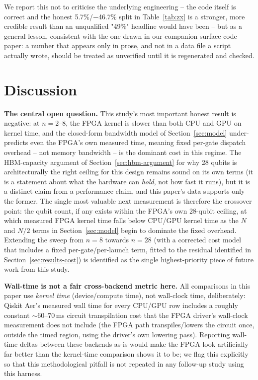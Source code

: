 \documentclass[pdflatex,sn-mathphys,Numbered]{sn-jnl}
\begin{document}
We report this not to criticise the underlying engineering -- the code itself is correct and the honest 5.7\%/$-$46.7\% split in Table~\ref{tab:zx} is a stronger, more credible result than an unqualified "49\%" headline would have been -- but as a general lesson, consistent with the one drawn in our companion surface-code paper: a number that appears only in prose, and not in a data file a script actually wrote, should be treated as unverified until it is regenerated and checked.

\section{Discussion}\label{sec:discussion}

\textbf{The central open question.} This study's most important honest result is negative: at $n=2$--8, the FPGA kernel is slower than both CPU and GPU on kernel time, and the closed-form bandwidth model of Section~\ref{sec:model} under-predicts even the FPGA's own measured time, meaning fixed per-gate dispatch overhead -- not memory bandwidth -- is the dominant cost in this regime. The HBM-capacity argument of Section~\ref{sec:hbm-argument} for why 28 qubits is architecturally the right ceiling for this design remains sound on its own terms (it is a statement about what the hardware can \emph{hold}, not how fast it runs), but it is a distinct claim from a performance claim, and this paper's data supports only the former. The single most valuable next measurement is therefore the crossover point: the qubit count, if any exists within the FPGA's own 28-qubit ceiling, at which measured FPGA kernel time falls below CPU/GPU kernel time as the $N$ and $N/2$ terms in Section~\ref{sec:model} begin to dominate the fixed overhead. Extending the sweep from $n=8$ towards $n=28$ (with a corrected cost model that includes a fixed per-gate/per-launch term, fitted to the residual identified in Section~\ref{sec:results-cost}) is identified as the single highest-priority piece of future work from this study.

\textbf{Wall-time is not a fair cross-backend metric here.} All comparisons in this paper use \emph{kernel time} (device/compute time), not wall-clock time, deliberately: Qiskit Aer's measured wall time for every CPU/GPU row includes a roughly constant $\sim$60--70\,ms circuit transpilation cost that the FPGA driver's wall-clock measurement does not include (the FPGA path transpiles/lowers the circuit once, outside the timed region, using the driver's own lowering pass). Reporting wall-time deltas between these backends as-is would make the FPGA look artificially far better than the kernel-time comparison shows it to be; we flag this explicitly so that this methodological pitfall is not repeated in any follow-up study using this harness.
\end{document}
